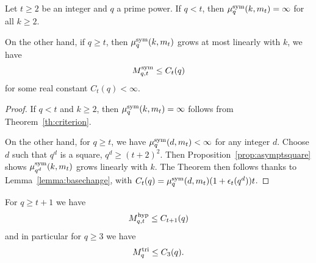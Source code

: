\begin{thm}
Let $t\geq2$ be an integer and $q$ a prime power.
If $q<t$, then $\mu^{\textrm{sym}}_q(k,m_t)=\infty$ for all $k\geq2$.

On the other hand, if $q\geq t$,
then $\mu^{\textrm{sym}}_q(k,m_t)$ grows at most linearly with $k$, \ie we have
\[
M^{\textrm{sym}}_{q,t}\leq C_t(q)
\]
for some real constant $C_t(q)<\infty$.
\end{thm}
\begin{proof}
If $q<t$ and $k\geq2$, then $\mu^{\textrm{sym}}_q(k,m_t)=\infty$ follows from Theorem~\ref{th:criterion}.

On the other hand, for $q\geq t$, we have $\mu^{\textrm{sym}}_q(d,m_t)<\infty$ for any integer $d$.
Choose $d$ such that $q^d$ is a square, $q^d\geq(t+2)^2$.
Then Proposition~\ref{prop:asymptsquare} shows $\mu^{\textrm{sym}}_{q^d}(k,m_t)$ grows linearly with $k$.
The Theorem then follows thanks to Lemma~\ref{lemma:basechange}, with $C_t(q)=\mu^{\textrm{sym}}_q(d,m_t)(1+\epsilon_t(q^d))t$.
\end{proof}
\begin{cor}
For $q\geq t+1$ we have
\[
M^{\textrm{hyp}}_{q,t}\leq C_{t+1}(q)
\]
and in particular for $q\geq 3$ we have
\[
M^{\textrm{tri}}_q\leq C_{3}(q).
\]
\end{cor}

%
